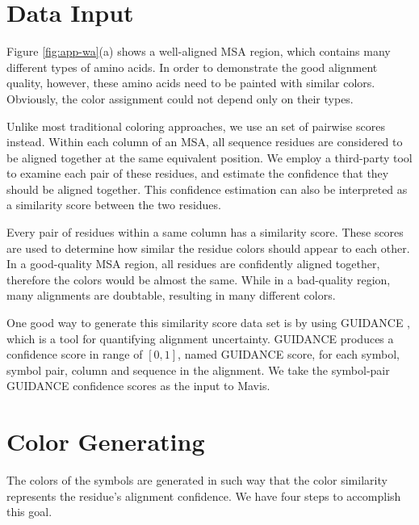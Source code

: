 \section{Data Input}

Figure \ref{fig:app-wa}(a) shows a well-aligned MSA region, which contains many different types of amino acids. In order to demonstrate the good alignment quality, however, these amino acids need to be painted with similar colors. Obviously, the color assignment could not depend only on their types.

Unlike most traditional coloring approaches, we use an set of pairwise scores instead. Within each column of an MSA, all sequence residues are considered to be aligned together at the same equivalent position. We employ a third-party tool to examine each pair of these residues, and estimate the confidence that they should be aligned together. This confidence estimation can also be interpreted as a similarity score between the two residues.

Every pair of residues within a same column has a similarity score. These scores are used to determine how similar the residue colors should appear to each other. In a good-quality MSA region, all residues are confidently aligned together, therefore the colors would be almost the same. While in a bad-quality region, many alignments are doubtable, resulting in many different colors.

One good way to generate this similarity score data set is by using GUIDANCE \cite{Penn:2010aa,Penn:2010ab}, which is a tool for quantifying alignment uncertainty. GUIDANCE produces a confidence score in range of $[0, 1]$, named GUIDANCE score, for each symbol, symbol pair, column and sequence in the alignment. We take the symbol-pair GUIDANCE confidence scores as the input to Mavis.

\section{Color Generating}

The colors of the symbols are generated in such way that the color similarity represents the residue's alignment confidence. We have four steps to accomplish this goal.

